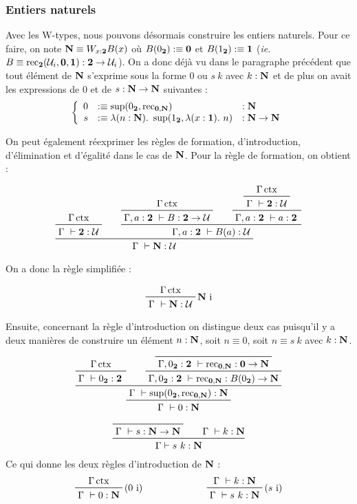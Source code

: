 \documentclass[../../rapport.tex]{subfiles}
\begin{document}
  \subsubsection{Entiers naturels}

  Avec les W-types, nous pouvons désormais construire les entiers naturels.
  Pour ce faire, on note $\mathbf N \equiv W_{x : \operatorname{\textbf{2}}}B(x)$ où $B(0_{\operatorname{\textbf{2}}}) :\equiv \operatorname{\textbf{0}}$ et $B(1_{\operatorname{\textbf{2}}}) :\equiv \operatorname{\textbf{1}}$
  (\textit{ie.} $B \equiv \operatorname{rec}_{\operatorname{\textbf{2}}}(\mathcal U_i, \operatorname{\textbf{0}}, \operatorname{\textbf{1}}) : \operatorname{\textbf{2}} \rightarrow \mathcal U_i$).
  On a donc déjà vu dans le paragraphe précédent que tout élément de $\mathbf N$ s'exprime sous la forme $0$ ou $s\ k$
  avec $k : \mathbf N$ et de plus on avait les expressions de $0$ et de $s : \mathbf N \rightarrow \mathbf N$ suivantes :
  $$\left\{ \begin{array}{rll}
      0 &:\equiv \sup(0_{\2}, \rec_{\0, \N}) 				&: \N \\
      s &:\equiv \lambda(n : \N).\ \sup(1_{\2}, \lambda(x : \1).\ n)	&: \N \fun \N
  \end{array}\right.$$

  On peut également réexprimer les règles de formation, d'introduction, d'élimination et d'égalité dans le cas de $\mathbf N$.
  Pour la règle de formation, on obtient :

  $$
  \prfinterspace=2em
  \prftree
    {\prftree{\Gamma \ctx}{\Gamma\ \vdash \2 : \U}}
    {\prftree
      {\prftree{\Gamma \ctx}{\Gamma, a : \2\ \vdash B : \2 \fun \U}}
      {\prftree
	{\prftree{\Gamma \ctx}{\Gamma\ \vdash \2 : \U}}
      {\Gamma, a : \2\ \vdash a : \2}}
    {\Gamma, a : \2\ \vdash B(a) : \U}}
  {\Gamma\ \vdash \N : \U}
  $$

  On a donc la règle simplifiée :

  $$
  \prftree[r]{$\N$ i}
    {\Gamma \ctx}
  {\Gamma\ \vdash \N : \U}
  $$

  Ensuite, concernant la règle d'introduction on distingue deux cas puisqu'il y a deux manières de construire
  un élément $n : \mathbf N$, soit $n \equiv 0$, soit $n \equiv s\ k$ avec $k : \mathbf N$.

  $$
  \prfinterspace=2em
  \prftree
    {\prftree
      {\prftree{\Gamma \ctx}{\Gamma\ \vdash 0_{\2} : \2}}
      {\prftree
	{\prfaxiom{\Gamma, 0_{\2} : \2\ \vdash \rec_{\0, \N} : \0 \fun \N}}
      {\Gamma, 0_{\2} : \2\ \vdash \rec_{\0, \N} : B(0_{\2}) \fun \N}}
    {\Gamma\ \vdash \sup(0_{\2}, \rec_{\0, \N}) : \N}}
  {\Gamma\ \vdash 0 : \N}
  $$

  $$
  \prfinterspace=2em
  \prftree
    {\prfaxiom{\Gamma\ \vdash s : \N \fun \N}}
    {\Gamma\ \vdash k : \N}
  {\Gamma \vdash s\ k : \N}
  $$
  Ce qui donne les deux règles d'introduction de $\mathbf N$ :
  $$\begin{array}{cc}
    \prftree[r]{($0$ i)}{\Gamma \ctx}{\Gamma\ \vdash 0 : \N}\hspace{2cm} & \prftree[r]{($s$ i)}{\Gamma\ \vdash k : \N}{\Gamma\ \vdash s\ k : \N}
  \end{array}$$
\end{document}
